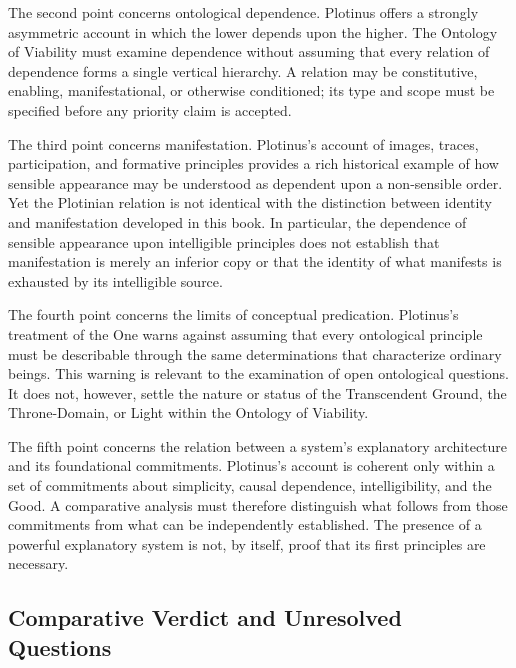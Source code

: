 \label{para:VS.B01.P01.C08.S06.SS09.P003}
The second point concerns ontological dependence. Plotinus offers
a strongly asymmetric account in which the lower depends upon
the higher. The Ontology of Viability must examine dependence
without assuming that every relation of dependence forms a single
vertical hierarchy. A relation may be constitutive, enabling,
manifestational, or otherwise conditioned; its type and scope
must be specified before any priority claim is accepted.

\label{para:VS.B01.P01.C08.S06.SS09.P004}
The third point concerns manifestation. Plotinus's account of
images, traces, participation, and formative principles provides
a rich historical example of how sensible appearance may be
understood as dependent upon a non-sensible order. Yet the
Plotinian relation is not identical with the distinction between
identity and manifestation developed in this book. In particular,
the dependence of sensible appearance upon intelligible principles
does not establish that manifestation is merely an inferior copy
or that the identity of what manifests is exhausted by its
intelligible source.

\label{para:VS.B01.P01.C08.S06.SS09.P005}
The fourth point concerns the limits of conceptual predication.
Plotinus's treatment of the One warns against assuming that every
ontological principle must be describable through the same
determinations that characterize ordinary beings. This warning
is relevant to the examination of open ontological questions.
It does not, however, settle the nature or status of the
Transcendent Ground, the Throne-Domain, or Light within the
Ontology of Viability.

\label{para:VS.B01.P01.C08.S06.SS09.P006}
The fifth point concerns the relation between a system's
explanatory architecture and its foundational commitments.
Plotinus's account is coherent only within a set of commitments
about simplicity, causal dependence, intelligibility, and the
Good. A comparative analysis must therefore distinguish what
follows from those commitments from what can be independently
established. The presence of a powerful explanatory system is
not, by itself, proof that its first principles are necessary.

\subsection{Comparative Verdict and Unresolved Questions}
\label{subsec:ch08-plotinus-verdict}

